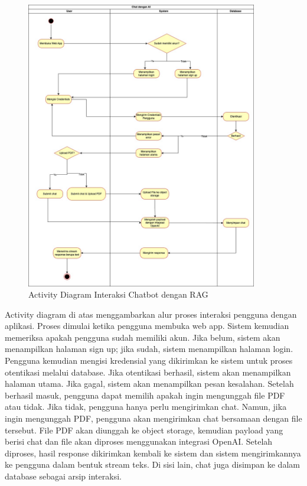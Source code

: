 \begin{figure}[H]
  \centering
  \includegraphics[width=0.9\textwidth]{images/bab-3/sitemap.jpg}
  \caption{Activity Diagram Interaksi Chatbot dengan RAG}
  \label{fig:activity}
\end{figure}

Activity diagram di atas menggambarkan alur proses interaksi pengguna dengan aplikasi. Proses dimulai ketika pengguna membuka web app. Sistem kemudian memeriksa apakah pengguna sudah memiliki akun. Jika belum, sistem akan menampilkan halaman sign up; jika sudah, sistem menampilkan halaman login. Pengguna kemudian mengisi kredensial yang dikirimkan ke sistem untuk proses otentikasi melalui database. Jika otentikasi berhasil, sistem akan menampilkan halaman utama. Jika gagal, sistem akan menampilkan pesan kesalahan.
\singlespacing{}
Setelah berhasil masuk, pengguna dapat memilih apakah ingin mengunggah file PDF atau tidak. Jika tidak, pengguna hanya perlu mengirimkan chat. Namun, jika ingin mengunggah PDF, pengguna akan mengirimkan chat bersamaan dengan file tersebut. File PDF akan diunggah ke object storage, kemudian payload yang berisi chat dan file akan diproses menggunakan integrasi OpenAI. Setelah diproses, hasil response dikirimkan kembali ke sistem dan sistem mengirimkannya ke pengguna dalam bentuk stream teks. Di sisi lain, chat juga disimpan ke dalam database sebagai arsip interaksi.

